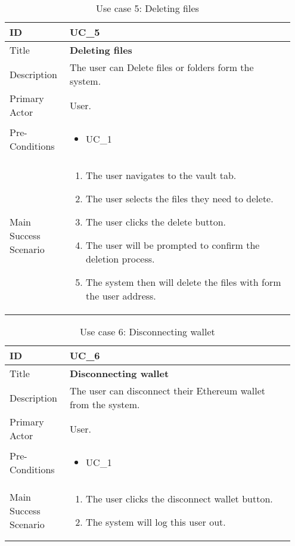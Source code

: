 \begin{longtable}{p{0.20\linewidth} | p{0.75\linewidth}}
  \caption{Use case 5: Deleting files}
  \label{tab:useCaseDelete}
  \\\toprule
  ID & UC\_5
  \\\midrule
  Title & \textbf{Deleting files}
  \\\hline
  Description & The user can Delete files or folders form the system.
  \\\hline
  Primary Actor & User.
  \\\hline
  Pre-Conditions & {
    \begin{itemize}
    \item UC\_1
    \end{itemize}
  }\vspace*{-\baselineskip}
  \\\hline
  Main Success Scenario & {
    \begin{enumerate}
    \item The user navigates to the vault tab.
    \item The user selects the files they need to delete.
    \item The user clicks the delete button.
    \item The user will be prompted to confirm the deletion process.
    \item The system then will delete the files with form the user address.
    \end{enumerate}
  }\vspace*{-\baselineskip}
  \\\bottomrule
\end{longtable}

\begin{longtable}{p{0.20\linewidth} | p{0.75\linewidth}}
  \caption{Use case 6: Disconnecting wallet}
  \label{tab:useCaseDisconnect}
  \\\toprule
  ID & UC\_6
  \\\midrule
  Title & \textbf{Disconnecting wallet}
  \\\hline
  Description & The user can disconnect their Ethereum wallet from the system.
  \\\hline
  Primary Actor & User.
  \\\hline
  Pre-Conditions & {
    \begin{itemize}
    \item UC\_1
    \end{itemize}
  }\vspace*{-\baselineskip}
  \\\hline
  Main Success Scenario & {
    \begin{enumerate}
    \item The user clicks the disconnect wallet button.
    \item The system will log this user out.
    \end{enumerate}
  }\vspace*{-\baselineskip}
  \\\bottomrule
\end{longtable}
